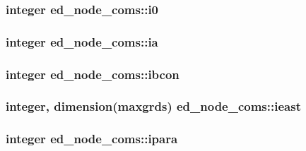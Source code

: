 \subsubsection[{i0}]{\setlength{\rightskip}{0pt plus 5cm}integer ed\+\_\+node\+\_\+coms\+::i0}\label{namespaceed__node__coms_a6326a182f11b478fe044adfb8a29573f}
\hypertarget{namespaceed__node__coms_a78402c54439b56822a5a8e6812a3ad90}{}
\subsubsection[{ia}]{\setlength{\rightskip}{0pt plus 5cm}integer ed\+\_\+node\+\_\+coms\+::ia}\label{namespaceed__node__coms_a78402c54439b56822a5a8e6812a3ad90}
\hypertarget{namespaceed__node__coms_a15c70a911fbe3be8baecfaa2c78e5340}{}
\subsubsection[{ibcon}]{\setlength{\rightskip}{0pt plus 5cm}integer ed\+\_\+node\+\_\+coms\+::ibcon}\label{namespaceed__node__coms_a15c70a911fbe3be8baecfaa2c78e5340}
\hypertarget{namespaceed__node__coms_a6aa981e6ec7f7d2b2aea7f3b372fadc9}{}
\subsubsection[{ieast}]{\setlength{\rightskip}{0pt plus 5cm}integer, dimension(maxgrds) ed\+\_\+node\+\_\+coms\+::ieast}\label{namespaceed__node__coms_a6aa981e6ec7f7d2b2aea7f3b372fadc9}
\hypertarget{namespaceed__node__coms_a6b574c65e348d02c2d74df596965828a}{}
\subsubsection[{ipara}]{\setlength{\rightskip}{0pt plus 5cm}integer ed\+\_\+node\+\_\+coms\+::ipara}\label{namespaceed__node__coms_a6b574c65e348d02c2d74df596965828a}
\hypertarget{namespaceed__node__coms_aa0b58de3ae40a5b1f807eeb1183579f9}{}
